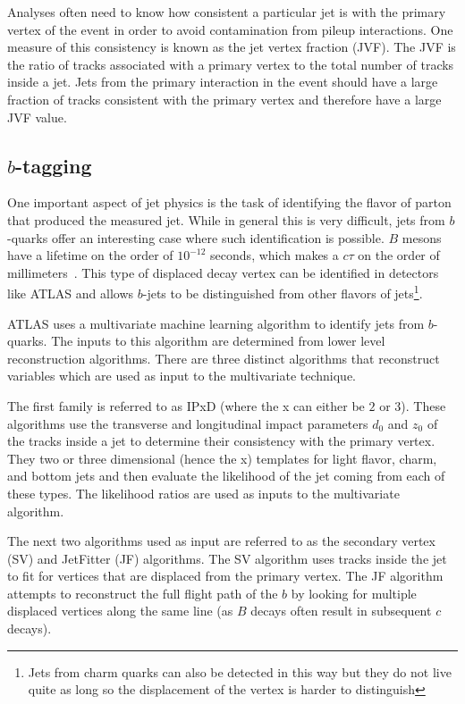 Analyses often need to know how consistent a particular jet is with the primary vertex of the event in order to avoid contamination from pileup interactions. One measure of this consistency is known as the jet vertex fraction (JVF). The JVF is the ratio of tracks associated with a primary vertex to the total number of tracks inside a jet. Jets from the primary interaction in the event should have a large fraction of tracks consistent with the primary vertex and therefore have a large JVF value. 

\subsection{$b$-tagging}

One important aspect of jet physics is the task of identifying the flavor of parton that produced the measured jet. While in general this is very difficult, jets from $b$-quarks offer an interesting case where such identification is possible. $B$ mesons have a lifetime on the order of $10^{-12}$ seconds, which makes a $c\tau$ on the order of millimeters~\cite{PDG}. This type of displaced decay vertex can be identified in detectors like ATLAS and allows $b$-jets to be distinguished from other flavors of jets\footnote{Jets from charm quarks can also be detected in this way but they do not live quite as long so the displacement of the vertex is harder to distinguish}.

ATLAS uses a multivariate machine learning algorithm to identify jets from $b$-quarks. The inputs to this algorithm are determined from lower level reconstruction algorithms. There are three distinct algorithms that reconstruct variables which are used as input to the multivariate technique. 

The first family is referred to as IPxD (where the x can either be $2$ or $3$). These algorithms use the transverse and longitudinal impact parameters $d_0$ and $z_0$ of the tracks inside a jet to determine their consistency with the primary vertex. They two or three dimensional (hence the x) templates for light flavor, charm, and bottom jets and then evaluate the likelihood of the jet coming from each of these types. The likelihood ratios are used as inputs to the multivariate algorithm. 

The next two algorithms used as input are referred to as the secondary vertex (SV) and JetFitter (JF) algorithms. The SV algorithm uses tracks inside the jet to fit for vertices that are displaced from the primary vertex. The JF algorithm attempts to reconstruct the full flight path of the $b$ by looking for multiple displaced vertices along the same line (as $B$ decays often result in subsequent $c$ decays). 

